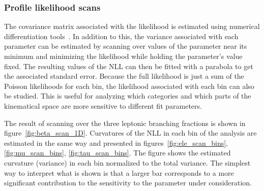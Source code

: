 \subsubsection{Profile likelihood scans}

The covariance matrix associated with the likelihood is estimated using
numerical differentiation tools~\cite{numdifftools}.  In addition to
this, the variance associated with each parameter can be estimated by
scanning over values of the parameter near its minimum and minimizing
the likelihood while holding the parameter's value fixed.  The resulting
values of the NLL can then be fitted with a parabola to get the
associated standard error.  Because the full likelihood is just a sum of
the Poisson likelihoods for each bin, the likelihood associated with
each bin can also be studied.  This is useful for analyzing which
categories and which parts of the kinematical space are more sensitive
to different fit parameters.  

The result of scanning over the three leptonic branching fractions is
shown in figure~\ref{fig:beta_scan_1D}.  Curvatures of the NLL in each bin
of the analysis are estimated in the same way and presented in
figures~\ref{fig:ele_scan_bins}, \ref{fig:mu_scan_bins}, \ref{fig:tau_scan_bins}.
The figure shows the estimated curvature (variance) in each bin
normalized to the total variance.  The simplest way to interpret what is
shown is that a larger bar corresponds to a more significant
contribution to the sensitivity to the parameter under consideration.

